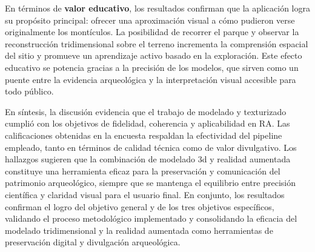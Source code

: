 En términos de \textbf{valor educativo}, los resultados confirman que la aplicación logra su propósito principal: ofrecer una aproximación visual a cómo pudieron verse originalmente los montículos. La posibilidad de recorrer el parque y observar la reconstrucción tridimensional sobre el terreno incrementa la comprensión espacial del sitio y promueve un aprendizaje activo basado en la exploración. Este efecto educativo se potencia gracias a la precisión de los modelos, que sirven como un puente entre la evidencia arqueológica y la interpretación visual accesible para todo público.

En síntesis, la discusión evidencia que el trabajo de modelado y texturizado cumplió con los objetivos de fidelidad, coherencia y aplicabilidad en RA. Las calificaciones obtenidas en la encuesta respaldan la efectividad del pipeline empleado, tanto en términos de calidad técnica como de valor divulgativo. Los hallazgos sugieren que la combinación de modelado \gls{3d} y realidad aumentada constituye una herramienta eficaz para la preservación y comunicación del patrimonio arqueológico, siempre que se mantenga el equilibrio entre precisión científica y claridad visual para el usuario final. En conjunto, los resultados confirman el logro del objetivo general y de los tres objetivos específicos, validando el proceso metodológico implementado y consolidando la eficacia del modelado tridimensional y la realidad aumentada como herramientas de preservación digital y divulgación arqueológica.